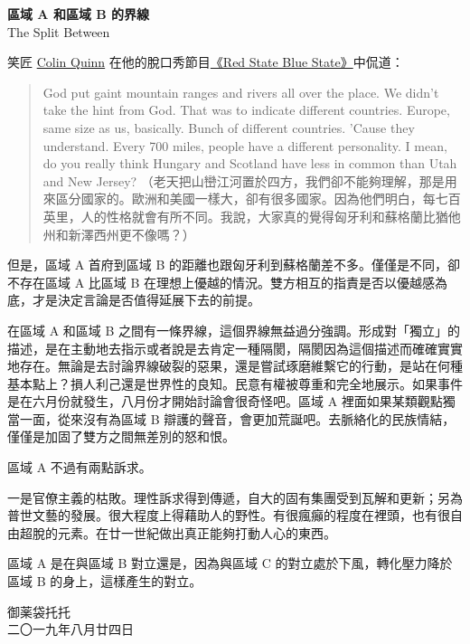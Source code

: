 \documentclass[10pt]{article}
\begin{document}
\begin{flushleft}
\textbf{區域 A 和區域 B 的界線}\\
The Split Between\\
\end{flushleft}
\vspace{3em}

笑匠 \href{https://en.wikipedia.org/wiki/Colin_Quinn}{Colin Quinn}
在他的脫口秀節目\href{https://www.imdb.com/title/tt10403090/}{《Red
State Blue State》}中侃道：

\begin{quote}
God put gaint mountain ranges and rivers all over the place. We didn't
take the hint from God. That was to indicate different countries.
Europe, same size as us, basically. Bunch of different countries. 'Cause
they understand. Every 700 miles, people have a different personality. I
mean, do you really think Hungary and Scotland have less in common than
Utah and New Jersey?
（老天把山巒江河置於四方，我們卻不能夠理解，那是用來區分國家的。歐洲和美國一樣大，卻有很多國家。因為他們明白，每七百英里，人的性格就會有所不同。我說，大家真的覺得匈牙利和蘇格蘭比猶他州和新澤西州更不像嗎？）
\end{quote}

但是，區域 A 首府到區域 B
的距離也跟匈牙利到蘇格蘭差不多。僅僅是不同，卻不存在區域 A 比區域 B
在理想上優越的情況。雙方相互的指責是否以優越感為底，才是決定言論是否值得延展下去的前提。

在區域 A 和區域 B
之間有一條界線，這個界線無益過分強調。形成對「獨立」的描述，是在主動地去指示或者說是去肯定一種隔閡，隔閡因為這個描述而確確實實地存在。無論是去討論界線破裂的惡果，還是嘗試琢磨維繫它的行動，是站在何種基本點上？損人利己還是世界性的良知。民意有權被尊重和完全地展示。如果事件是在六月份就發生，八月份才開始討論會很奇怪吧。區域
A 裡面如果某類觀點獨當一面，從來沒有為區域 B
辯護的聲音，會更加荒誕吧。去脈絡化的民族情結，僅僅是加固了雙方之間無差別的怒和恨。

區域 A 不過有兩點訴求。

一是官僚主義的枯敗。理性訴求得到傳遞，自大的固有集團受到瓦解和更新；另為普世文藝的發展。很大程度上得藉助人的野性。有很瘋癲的程度在裡頭，也有很自由超脫的元素。在廿一世紀做出真正能夠打動人心的東西。

區域 A 是在與區域 B 對立還是，因為與區域 C
的對立處於下風，轉化壓力降於區域 B 的身上，這樣產生的對立。

\vspace{3em}
\begin{flushleft}
\small{御薬袋托托\\
二〇一九年八月廿四日}
\end{flushleft}
\end{document}

